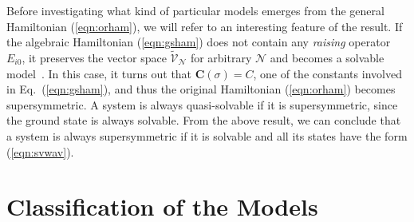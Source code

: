 \documentclass[a4paper,preprint,amsfonts,amssymb,amsmath,%
tightenlines,nofootinbib,noshowpacs]{revtex4}
\newcommand{\cN}{\mathcal{N}}
\newcommand{\cV}{\mathcal{V}}
\newcommand{\bC}{\boldsymbol{C}}
\begin{document}
Before investigating what kind of particular models emerges from
the general Hamiltonian (\ref{eqn:orham}), we will refer to
an interesting feature of the result. If the algebraic Hamiltonian
(\ref{eqn:gsham}) does not contain any \textit{raising} operator
$E_{i0}$, it preserves the vector space $\tilde{\cV}_{\cN}$ for
arbitrary $\cN$ and becomes a solvable model~\cite{Turbi2,Ushve}.
In this case, it turns out that $\bC(\sigma)=C$, one of the
constants involved in Eq.~(\ref{eqn:gsham}), and thus the
original Hamiltonian (\ref{eqn:orham}) becomes supersymmetric.
A system is always quasi-solvable if it is supersymmetric,
since the ground state is always solvable.
From the above result, we can conclude that a system is always
supersymmetric if it is solvable and all its states have the form
(\ref{eqn:svwav}).

\section{\label{sec:class}Classification of the Models}
\end{document}
